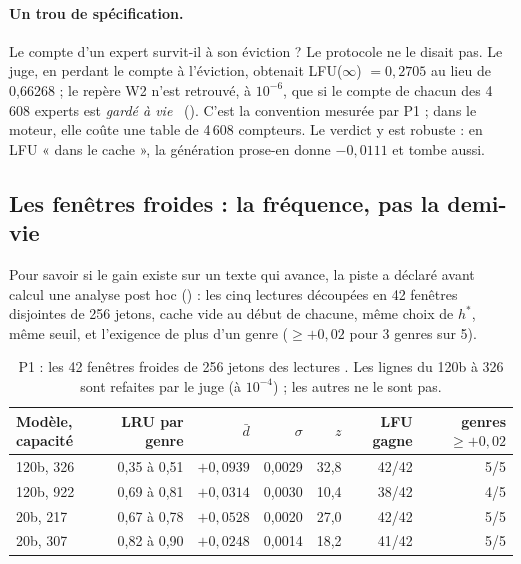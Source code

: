 \paragraph{Un trou de spécification.} Le compte d'un expert survit-il à son éviction ? Le protocole ne le disait pas. Le juge, en perdant le compte à l'éviction, obtenait LFU($\infty$) $= 0{,}2705$ au lieu de 0,66268 ; le repère W2 n'est retrouvé, à $10^{-6}$, que si le compte de chacun des 4\,608 experts est \emph{gardé à vie} \mes~(). C'est la convention mesurée par P1 ; dans le moteur, elle coûte une table de 4\,608 compteurs. Le verdict y est robuste : en LFU « dans le cache », la génération prose-en donne $-0{,}0111$ et tombe aussi.

\subsection{Les fenêtres froides : la fréquence, pas la demi-vie}\label{t3mim:sec:p1-fenetres}

Pour savoir si le gain existe sur un texte qui avance, la piste a déclaré avant calcul une analyse post hoc () : les cinq lectures découpées en 42 fenêtres disjointes de 256 jetons, cache vide au début de chacune, même choix de $h^\ast$, même seuil, et l'exigence de plus d'un genre ($\ge +0{,}02$ pour 3 genres sur 5).

\begin{table}[tbp]
\centering\small
\caption[P1 : les fenêtres froides de 256 jetons]{P1 : les 42 fenêtres froides de 256 jetons des lectures \mes. Les lignes du 120b à 326 sont refaites par le juge (à $10^{-4}$) ; les autres ne le sont pas.}
\label{t3mim:tab:p1-fenetres}
\begin{tabular}{@{}lrrrrrr@{}}
\toprule
Modèle, capacité & LRU par genre & $\bar d$ & $\sigma$ & $z$ & LFU gagne & genres $\ge +0{,}02$ \\
\midrule
120b, 326 & 0,35 à 0,51 & $+0{,}0939$ & 0,0029 & 32,8 & 42/42 & 5/5 \\
120b, 922 & 0,69 à 0,81 & $+0{,}0314$ & 0,0030 & 10,4 & 38/42 & 4/5 \\
20b, 217 & 0,67 à 0,78 & $+0{,}0528$ & 0,0020 & 27,0 & 42/42 & 5/5 \\
20b, 307 & 0,82 à 0,90 & $+0{,}0248$ & 0,0014 & 18,2 & 41/42 & 5/5 \\
\bottomrule
\end{tabular}
\end{table}

